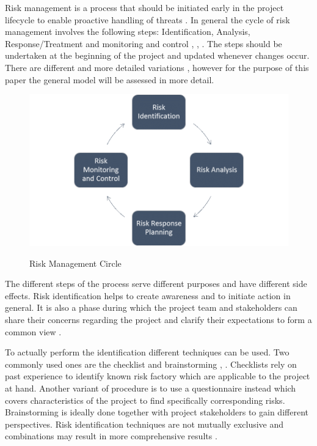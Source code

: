 Risk management is a process that should be initiated early in the project lifecycle to enable proactive handling of threats \cite{islamSoftwareDevelopmentRisk2011}. In general the cycle of risk management involves the following steps: Identification, Analysis, Response/Treatment and monitoring and control \cite{islamSoftwareDevelopmentRisk2011}, \cite{teschITProjectRisk2007}, \cite{didragaRoleEffectsRisk2013}. The steps should be undertaken at the beginning of the project and updated whenever changes occur. There are different and more detailed variations \cite{teschITProjectRisk2007}, however for the purpose of this paper the general model will be assessed in more detail.

\begin{figure}[htbp] 
	\centering
	\includegraphics[width=1.0\textwidth]{Content/Theory/RiskManagementCycle.png}
	\caption{Risk Management Circle}
	\cite{own representation}
	\label{fig:riskmanagmentcycle}
\end{figure}

The different steps of the process serve different purposes and have different side effects. Risk identification helps to create awareness and to initiate action in general. It is also a phase during which the project team and stakeholders can share their concerns regarding the project and clarify their expectations to form a common view \cite{didragaRoleEffectsRisk2013}.

To actually perform the identification different techniques can be used. Two commonly used ones are the checklist and brainstorming \cite{islamSoftwareDevelopmentRisk2011}, \cite{didragaRoleEffectsRisk2013}. Checklists rely on past experience to identify known risk factory which are applicable to the project at hand. Another variant of procedure is to use a questionnaire instead which covers characteristics of the project to find specifically corresponding risks. Brainstorming is ideally done together with project stakeholders to gain different perspectives. Risk identification techniques are not mutually exclusive and combinations may result in more comprehensive results \cite{islamSoftwareDevelopmentRisk2011}.

